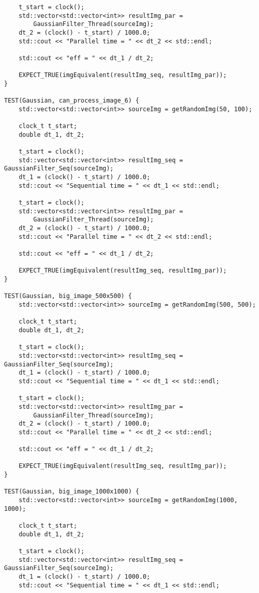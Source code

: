 \documentclass{report}
\begin{document}
\begin{lstlisting}
    t_start = clock();
    std::vector<std::vector<int>> resultImg_par =
        GaussianFilter_Thread(sourceImg);
    dt_2 = (clock() - t_start) / 1000.0;
    std::cout << "Parallel time = " << dt_2 << std::endl;

    std::cout << "eff = " << dt_1 / dt_2;

    EXPECT_TRUE(imgEquivalent(resultImg_seq, resultImg_par));
}

TEST(Gaussian, can_process_image_6) {
    std::vector<std::vector<int>> sourceImg = getRandomImg(50, 100);

    clock_t t_start;
    double dt_1, dt_2;

    t_start = clock();
    std::vector<std::vector<int>> resultImg_seq = GaussianFilter_Seq(sourceImg);
    dt_1 = (clock() - t_start) / 1000.0;
    std::cout << "Sequential time = " << dt_1 << std::endl;

    t_start = clock();
    std::vector<std::vector<int>> resultImg_par =
        GaussianFilter_Thread(sourceImg);
    dt_2 = (clock() - t_start) / 1000.0;
    std::cout << "Parallel time = " << dt_2 << std::endl;

    std::cout << "eff = " << dt_1 / dt_2;

    EXPECT_TRUE(imgEquivalent(resultImg_seq, resultImg_par));
}

TEST(Gaussian, big_image_500x500) {
    std::vector<std::vector<int>> sourceImg = getRandomImg(500, 500);

    clock_t t_start;
    double dt_1, dt_2;

    t_start = clock();
    std::vector<std::vector<int>> resultImg_seq = GaussianFilter_Seq(sourceImg);
    dt_1 = (clock() - t_start) / 1000.0;
    std::cout << "Sequential time = " << dt_1 << std::endl;

    t_start = clock();
    std::vector<std::vector<int>> resultImg_par =
        GaussianFilter_Thread(sourceImg);
    dt_2 = (clock() - t_start) / 1000.0;
    std::cout << "Parallel time = " << dt_2 << std::endl;

    std::cout << "eff = " << dt_1 / dt_2;

    EXPECT_TRUE(imgEquivalent(resultImg_seq, resultImg_par));
}

TEST(Gaussian, big_image_1000x1000) {
    std::vector<std::vector<int>> sourceImg = getRandomImg(1000, 1000);

    clock_t t_start;
    double dt_1, dt_2;

    t_start = clock();
    std::vector<std::vector<int>> resultImg_seq = GaussianFilter_Seq(sourceImg);
    dt_1 = (clock() - t_start) / 1000.0;
    std::cout << "Sequential time = " << dt_1 << std::endl;


\end{lstlisting}
\end{document}
